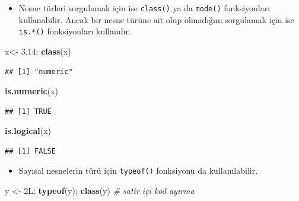 \documentclass[
  oneside]{book}
\newenvironment{Shaded}{\begin{snugshade}}{\end{snugshade}}
\newcommand{\CommentTok}[1]{\textcolor[rgb]{0.56,0.35,0.01}{\textit{#1}}}
\newcommand{\FloatTok}[1]{\textcolor[rgb]{0.00,0.00,0.81}{#1}}
\newcommand{\FunctionTok}[1]{\textcolor[rgb]{0.13,0.29,0.53}{\textbf{#1}}}
\newcommand{\NormalTok}[1]{#1}
\newcommand{\OtherTok}[1]{\textcolor[rgb]{0.56,0.35,0.01}{#1}}
\providecommand{\tightlist}{%
  \setlength{\itemsep}{0pt}\setlength{\parskip}{0pt}}
\begin{document}
\begin{itemize}
\tightlist
\item
  Nesne türleri sorgulamak için ise \texttt{class()} ya da \texttt{mode()} fonksiyonları kullanabilir. Ancak bir nesne türüne ait olup olmadığını sorgulamak için ise \texttt{is.*()} fonksiyonları kullanılır.
\end{itemize}

\begin{Shaded}
\begin{Highlighting}[]
\NormalTok{x}\OtherTok{\textless{}{-}} \FloatTok{3.14}\NormalTok{; }\FunctionTok{class}\NormalTok{(x)}
\end{Highlighting}
\end{Shaded}

\begin{verbatim}
## [1] "numeric"
\end{verbatim}

\begin{Shaded}
\begin{Highlighting}[]
\FunctionTok{is.numeric}\NormalTok{(x)}
\end{Highlighting}
\end{Shaded}

\begin{verbatim}
## [1] TRUE
\end{verbatim}

\begin{Shaded}
\begin{Highlighting}[]
\FunctionTok{is.logical}\NormalTok{(x)}
\end{Highlighting}
\end{Shaded}

\begin{verbatim}
## [1] FALSE
\end{verbatim}

\begin{itemize}
\tightlist
\item
  Sayısal nesnelerin türü için \texttt{typeof()} fonksiyonu da kullanılabilir.
\end{itemize}

\begin{Shaded}
\begin{Highlighting}[]
\NormalTok{y }\OtherTok{\textless{}{-}}\NormalTok{ 2L; }\FunctionTok{typeof}\NormalTok{(y); }\FunctionTok{class}\NormalTok{(y) }\CommentTok{\# satir içi kod ayırma}
\end{Highlighting}
\end{Shaded}
\end{document}
